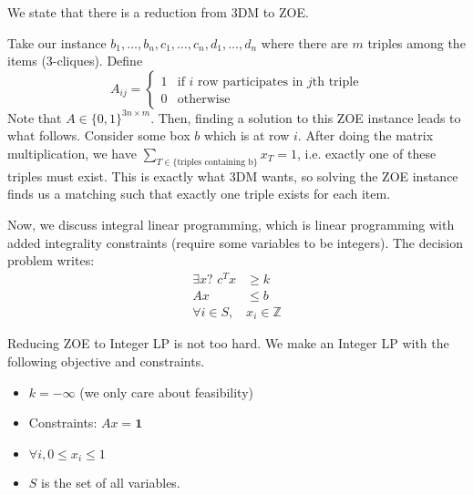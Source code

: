 We state that there is a reduction from 3DM to ZOE.
\begin{algothm}
    Take our instance $b_1, \dots, b_n, c_1, \dots, c_n, d_1, \dots, d_n$ where there are $m$ triples among the items (3-cliques). Define
    \[ A_{ij} = \begin{cases}
        1 & \text{if $i$ row participates in $j$th triple} \\
        0 & \text{otherwise}
    \end{cases}\]
    Note that $A \in \{0,1\}^{3n \times m}$. Then, finding a solution to this ZOE instance leads to what follows. Consider some box $b$ which is at row $i$. After doing the matrix multiplication,
    we have $\sum_{T \in \{\text{triples containing b}\}} x_T = 1$, i.e. exactly one of these triples must exist. This is exactly what 3DM wants, so solving the ZOE instance
    finds us a matching such that exactly one triple exists for each item.
\end{algothm}

Now, we discuss integral linear programming, which is linear programming with added integrality constraints (require some variables to be integers).
The decision problem writes:
\begin{align*}
    \exists x\text{? } c^Tx &\geq k \\
    Ax &\leq b \\
    \forall i \in S, &x_i \in \mathbb{Z}
\end{align*}

Reducing ZOE to Integer LP is not too hard. We make an Integer LP with the following objective and constraints.
\begin{itemize}
    \item $k = -\infty$ (we only care about feasibility)
    \item Constraints: $Ax = \textbf{1}$
    \item $\forall i, 0 \leq x_i \leq 1$
    \item $S$ is the set of all variables.
\end{itemize}